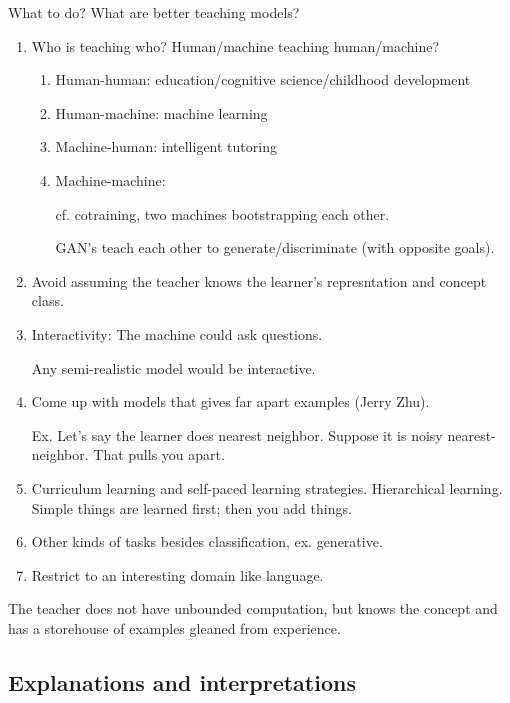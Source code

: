 What to do? What are better teaching models?

\begin{enumerate}
\item
Who is teaching who? Human/machine teaching human/machine? 
\begin{enumerate}
\item
Human-human: education/cognitive science/childhood development
\item 
Human-machine:
machine learning
\item
Machine-human: intelligent tutoring
\item
Machine-machine: 

cf. cotraining, two machines bootstrapping each other.

GAN's teach each other to generate/discriminate (with opposite goals).
\end{enumerate}
\item
Avoid assuming the teacher knows the learner's represntation and concept class.
%
\item
Interactivity: The machine could ask questions.

Any semi-realistic model would be interactive.
\item
Come up with models that gives far apart examples (Jerry Zhu).

Ex. Let's say the learner does nearest neighbor. Suppose it is noisy nearest-neighbor. That pulls you apart.
\item
Curriculum learning and self-paced learning strategies.
Hierarchical learning.
Simple things are learned first; then you add things.
\item Other kinds of tasks besides classification, ex. generative.
\item Restrict to an interesting domain like language.
\end{enumerate}

The teacher does not have unbounded computation, but knows the concept and has a storehouse of examples gleaned from experience.  

\subsection{Explanations and interpretations}

